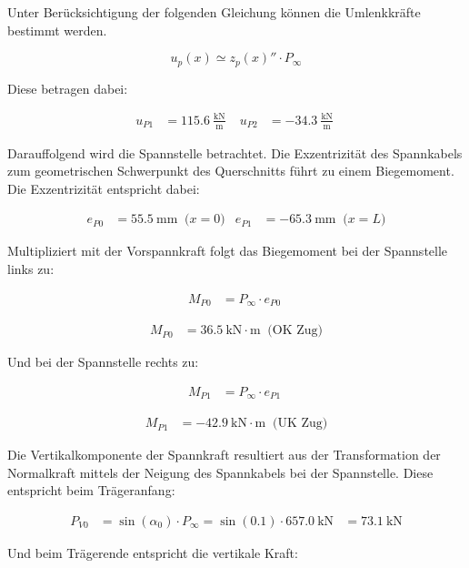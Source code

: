 \documentclass[
  11pt,
  letterpaper,
]{scrreprt}
\begin{document}
Unter Berücksichtigung der folgenden Gleichung können die Umlenkkräfte
bestimmt werden.

\[
u_p(x) \simeq z_p(x)'' \cdot P_{\infty}
\]

Diese betragen dabei:

$$
\begin{aligned}
u_{P1} &= 115.6\ \frac{\mathrm{kN}}{\mathrm{m}} \; 
 &u_{P2} &= -34.3\ \frac{\mathrm{kN}}{\mathrm{m}} \;
\end{aligned}
$$

Darauffolgend wird die Spannstelle betrachtet. Die Exzentrizität des
Spannkabels zum geometrischen Schwerpunkt des Querschnitts führt zu
einem Biegemoment. Die Exzentrizität entspricht dabei:

$$
\begin{aligned}
e_{P0} &= 55.5\ \mathrm{mm} \; \;\textrm{($x=0$)}
 &e_{P1} &= -65.3\ \mathrm{mm} \; \;\textrm{($x=L$)}
\end{aligned}
$$

Multipliziert mit der Vorspannkraft folgt das Biegemoment bei der
Spannstelle links zu:

$$
\begin{aligned}
M_{P0} &= P_{\infty} \cdot e_{P0} \; 
\end{aligned}
$$

$$
\begin{aligned}
M_{P0} &= 36.5\ \mathrm{kN} \cdot \mathrm{m} \; \;\textrm{(OK Zug)}
\end{aligned}
$$

Und bei der Spannstelle rechts zu:

$$
\begin{aligned}
M_{P1} &= P_{\infty} \cdot e_{P1} \; 
\end{aligned}
$$

$$
\begin{aligned}
M_{P1} &= -42.9\ \mathrm{kN} \cdot \mathrm{m} \; \;\textrm{(UK Zug)}
\end{aligned}
$$

Die Vertikalkomponente der Spannkraft resultiert aus der Transformation
der Normalkraft mittels der Neigung des Spannkabels bei der Spannstelle.
Diese entspricht beim Trägeranfang:

$$
\begin{aligned}
P_{V0} &= \sin \left( \alpha_{0} \right) \cdot P_{\infty}  = \sin \left( 0.1 \right) \cdot 657.0\ \mathrm{kN} &= 73.1\ \mathrm{kN}  
\end{aligned}
$$

Und beim Trägerende entspricht die vertikale Kraft:
\end{document}
